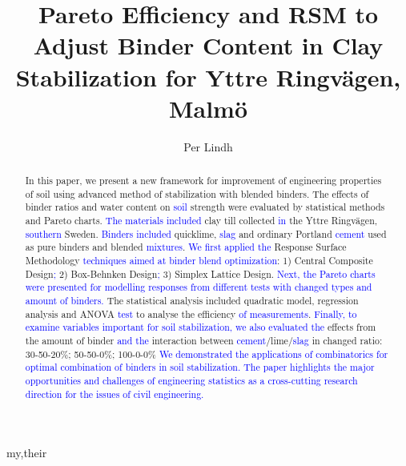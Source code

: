 \documentclass[eprint,
]{actapoly}
\begin{document}
\title[Pareto Efficiency and RSM to Adjust Binder Content]
{Pareto Efficiency and RSM to Adjust Binder Content in Clay Stabilization for Yttre Ringvägen, Malmö}

\author[P. Lindh]{Per Lindh}{my,their}


\begin{abstract}
In this paper, we present a new framework for improvement of engineering properties of soil using advanced method of stabilization with blended binders. The effects of binder ratios and water content on \textcolor{blue}{soil} strength were evaluated by statistical methods and Pareto charts. \textcolor{blue}{The materials included} clay till collected \textcolor{blue}{in} the Yttre Ringvägen, \textcolor{blue}{southern} Sweden. \textcolor{blue}{Binders included} quicklime, \textcolor{blue}{slag} and ordinary Portland \textcolor{blue}{cement} used as pure binders and blended \textcolor{blue}{mixtures}. \textcolor{blue}{We first applied the} Response Surface Methodology \textcolor{blue}{techniques aimed at binder blend optimization}: 1) Central Composite Design\textcolor{blue}{;} 2) Box-Behnken Design\textcolor{blue}{;} 3) Simplex Lattice Design. \textcolor{blue}{Next, the Pareto charts were presented for modelling responses from different tests with changed types and amount of binders.} The statistical analysis included quadratic model, regression analysis and ANOVA \textcolor{blue}{test} to analyse the efficiency \textcolor{blue}{of measurements}. \textcolor{blue}{Finally, to examine variables important for soil stabilization, we also evaluated the }effects from the amount of binder \textcolor{blue}{and the} interaction between \textcolor{blue}{cement}/lime/\textcolor{blue}{slag} in changed ratio: 30-50-20\%; 50-50-0\%; 100-0-0\% \textcolor{blue}{We demonstrated the applications of combinatorics for optimal combination of binders in soil stabilization. The paper highlights the major opportunities and challenges of engineering statistics as a cross-cutting research direction for the issues of civil engineering.}
\end{abstract}
\end{document}

